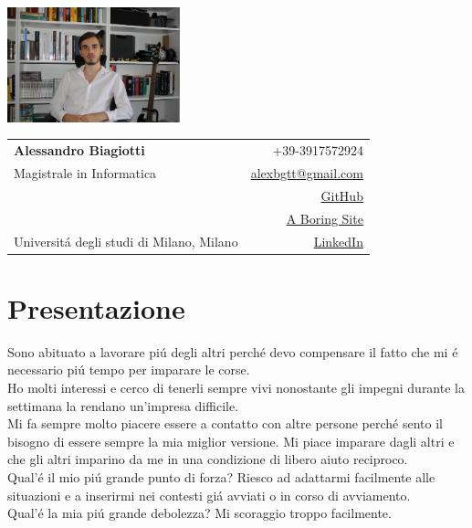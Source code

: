 \documentclass[a4paper,11pt]{article}
\makeatletter
\newcommand{\name}{Alessandro Biagiotti} %
\newcommand{\course}{Magistrale in Informatica} %
\newcommand{\phone}{3917572924} %
\newcommand{\email}{alexbgtt@gmail.com} %
\newcommand{\github}{S3gmentati0nFault} %
\newcommand{\website}{https://www.aboringsite.com/} %
\newcommand{\linkedin}{alessandro-biagiotti-a863a81a2/} %
\makeatother
\begin{document}
\selectfont
\parbox{5.25cm}{%

\includegraphics[width=5cm,clip]{foto_curriculum.JPG}

}\parbox{\dimexpr\linewidth-5.25cm\relax}{
\begin{tabularx}{\linewidth}{L r}
  \textbf{\LARGE \name} & +39-\phone\\
  
  \course &  \href{mailto:\email}{\email}\\
   &  \href{https://github.com/\github}{GitHub} \\
   &  \href{\website}{A Boring Site}\\
  {Universitá degli studi di Milano, Milano} & \href{https://www.linkedin.com/in/\linkedin/}
  {LinkedIn}
\end{tabularx}
}

\vspace{-0.5mm}
\section{\textbf{Presentazione}}
Sono abituato a lavorare piú degli altri perché devo compensare il fatto che mi é necessario piú tempo per 
imparare le corse.\\
Ho molti interessi e cerco di tenerli sempre vivi nonostante gli impegni durante la settimana la rendano 
un'impresa difficile.\\
Mi fa sempre molto piacere essere a contatto con altre persone perché sento il bisogno di essere sempre la 
mia miglior versione. Mi piace imparare dagli altri e che gli altri imparino da me in una condizione di 
libero aiuto reciproco.\\
Qual'é il mio piú grande punto di forza? Riesco ad adattarmi facilmente alle situazioni e a inserirmi nei 
contesti giá avviati o in corso di avviamento.\\
Qual'é la mia piú grande debolezza? Mi scoraggio troppo facilmente.

\end{document}
